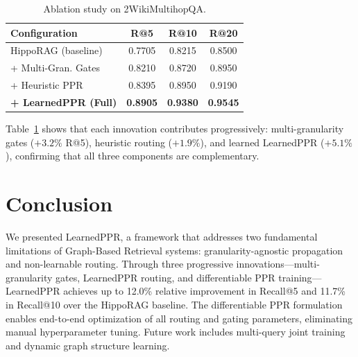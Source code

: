 \documentclass[conference,a4paper]{IEEEtran}
\begin{document}
\begin{table}[t]
\centering
\small
\begin{tabular}{l ccc}
\toprule
\textbf{Configuration} & \textbf{R@5} & \textbf{R@10} & \textbf{R@20} \\
\midrule
HippoRAG (baseline) & 0.7705 & 0.8215 & 0.8500 \\
+ Multi-Gran. Gates & 0.8210 & 0.8720 & 0.8950 \\
+ Heuristic PPR & 0.8395 & 0.8950 & 0.9190 \\
\textbf{+ LearnedPPR (Full)} & \textbf{0.8905} & \textbf{0.9380} & \textbf{0.9545} \\
\bottomrule
\end{tabular}
\caption{Ablation study on 2WikiMultihopQA.}
\label{tab:ablation}
\end{table}

Table~\ref{tab:ablation} shows that each innovation contributes progressively: multi-granularity gates ($+3.2\%$ R@5), heuristic routing ($+1.9\%$), and learned LearnedPPR ($+5.1\%$), confirming that all three components are complementary.

\section{Conclusion}\label{sec:conclusion}

We presented LearnedPPR, a framework that addresses two fundamental limitations of Graph-Based Retrieval systems: granularity-agnostic propagation and non-learnable routing. Through three progressive innovations---multi-granularity gates, LearnedPPR routing, and differentiable PPR training---LearnedPPR achieves up to 12.0\% relative improvement in Recall@5 and 11.7\% in Recall@10 over the HippoRAG baseline. The differentiable PPR formulation enables end-to-end optimization of all routing and gating parameters, eliminating manual hyperparameter tuning. Future work includes multi-query joint training and dynamic graph structure learning.



\end{document}
